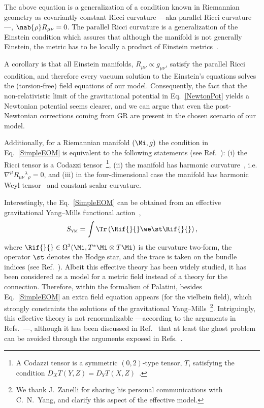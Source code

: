 \documentclass[aps,prl,twocolumn,superscriptaddress,showpacs,showkeys]{revtex4-1}
\begin{document}
The above equation is a generalization of a condition known in Riemannian geometry as covariantly constant Ricci curvature ---aka parallel Ricci curvature---, \mbox{$\nab{\rho} R_{\mu\nu} = 0$.} The parallel Ricci curvature is a generalization of the Einstein condition which assures that although the manifold is not generally Einstein, the metric has to be locally a product of Einstein metrics~\cite{Besse}.

A corollary is that all Einstein manifolds, \mbox{$R_{\mu\nu} \propto g_{\mu\nu}$,} satisfy the parallel Ricci condition, and therefore every vacuum solution to the Einstein's equations solves the (torsion-free) field equations of our model. Consequently, the fact that the non-relativistic limit of the gravitational potential in Eq.~\eqref{NewtonPot} yields a Newtonian potential seems clearer, and we can argue that even the post-Newtonian corrections coming from GR are present in the chosen scenario of our model.

Additionally, for a Riemannian manifold $(\Mi,g)$ the condition in Eq.~\eqref{SimpleEOM} is equivalent to the following statements (see Ref.~\cite{Derdzinski:1985,Besse}): (i) the Ricci tensor is a Codazzi tensor~\footnote{A Codazzi tensor is a symmetric $(0,2)$-type tensor, $T$, satisfying the condition \mbox{$D_X T(Y,Z) = D_Y T(X,Z)$~\cite{Derdzinski01071983}.}}, (ii) the manifold has harmonic curvature~\cite{bourguignon1981varietes}, i.e. \mbox{$\nabla^\mu R_{\mu\nu}{}^\lambda{}_\rho = 0$,} and (iii) in the four-dimensional case the manifold has harmonic Weyl tensor~\cite{Berger:1969} and constant scalar curvature.

Interestingly, the Eq.~\eqref{SimpleEOM} can be obtained from an effective gravitational Yang--Mills functional action~\cite{stephenson1958quadratic,kilmister1961use,Yang1974},
\begin{equation}
  S_{\textsc{ym}} = \int \Tr \left( \Rif{}{} \we \st \Rif{}{} \right),
\end{equation}
where $\Rif{}{} \in \Omega^2(\Mi, T^*\Mi \otimes T\Mi)$ is the curvature two-form, the operator $\st$ denotes the Hodge star, and the trace is taken on the bundle indices (see Ref.~\cite{bourguignon1982yang}). Albeit this effective theory has been widely studied, it has been considered as a model for a metric field instead of a theory for the connection. Therefore, within the formalism of Palatini, besides Eq.~\eqref{SimpleEOM} an extra field equation appears (for the vielbein field), which strongly constraints the solutions of the gravitational Yang--Mills~\footnote{We thank J.~Zanelli for sharing his personal communications with C.~N.~Yang, and clarify this aspect of the effective model.}. Intriguingly, this effective theory is not renormalizable ---according to the arguments in Refs.~\cite{McGady:2013sga,Camanho:2014apa}---, although it has been discussed in Ref.~\cite{Chen:2010at} that at least the ghost problem can be avoided through the arguments exposed in Refs.~\cite{Kleinert:1987eb,Bender:2007wu,Bender:2008vh,Mannheim:2009zj}.
\end{document}
